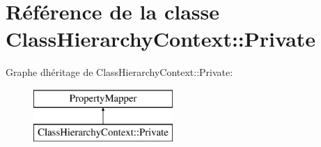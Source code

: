 \hypertarget{class_class_hierarchy_context_1_1_private}{}\section{Référence de la classe Class\+Hierarchy\+Context\+:\+:Private}
\label{class_class_hierarchy_context_1_1_private}
Graphe d\textquotesingle{}héritage de Class\+Hierarchy\+Context\+:\+:Private\+:\begin{figure}[H]
\begin{center}
\leavevmode
\includegraphics[height=2.000000cm]{class_class_hierarchy_context_1_1_private}
\end{center}
\end{figure}
